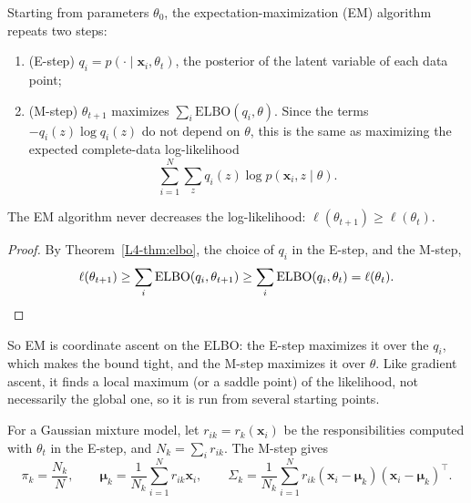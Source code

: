 \begin{definition}[EM algorithm]\label{L4-def:em}
    Starting from parameters $\theta_0$, the expectation-maximization (EM) algorithm repeats two steps:
    \begin{enumerate}
        \item (E-step) $q_i = p(\cdot \mid \mathbf{x}_i, \theta_t)$, the posterior of the latent variable of each data point;
        \item (M-step) $\theta_{t+1}$ maximizes $\sum_i \mathrm{ELBO}(q_i, \theta)$. Since the terms $-q_i(z)\log q_i(z)$ do not depend on $\theta$, this is the same as maximizing the expected complete-data log-likelihood
        \[\sum_{i=1}^N \sum_z q_i(z)\log p(\mathbf{x}_i, z \mid \theta).\]
    \end{enumerate}
\end{definition}

\begin{theorem}\label{L4-thm:em-monotone}
    The EM algorithm never decreases the log-likelihood: $\ell(\theta_{t+1}) \geq \ell(\theta_t)$.
\end{theorem}

\begin{proof}
    By Theorem~\ref{L4-thm:elbo}, the choice of $q_i$ in the E-step, and the M-step,
    \[\ell(\theta_{t+1}) \geq \sum_i \mathrm{ELBO}(q_i, \theta_{t+1}) \geq \sum_i \mathrm{ELBO}(q_i, \theta_t) = \ell(\theta_t). \qedhere\]
\end{proof}

So EM is coordinate ascent on the ELBO: the E-step maximizes it over the $q_i$, which makes the bound tight, and the M-step maximizes it over $\theta$. Like gradient ascent, it finds a local maximum (or a saddle point) of the likelihood, not necessarily the global one, so it is run from several starting points.

\begin{theorem}\label{L4-thm:em-gmm}
    For a Gaussian mixture model, let $r_{ik} = r_k(\mathbf{x}_i)$ be the responsibilities computed with $\theta_t$ in the E-step, and $N_k = \sum_i r_{ik}$. The M-step gives
    \[\pi_k = \frac{N_k}{N}, \qquad \boldsymbol{\mu}_k = \frac{1}{N_k}\sum_{i=1}^N r_{ik}\mathbf{x}_i, \qquad \Sigma_k = \frac{1}{N_k}\sum_{i=1}^N r_{ik}(\mathbf{x}_i - \boldsymbol{\mu}_k)(\mathbf{x}_i - \boldsymbol{\mu}_k)^\top.\]
\end{theorem}


